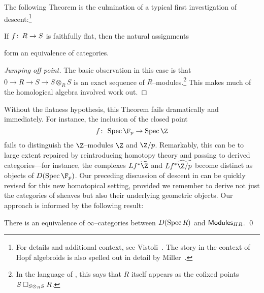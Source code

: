 The following Theorem is the culmination of a typical first investigation of descent:\footnote{For details and additional context, see Vistoli~\cite[Section 4.2.1]{Vistoli}.  The story in the context of Hopf algebroids is also spelled out in detail by Miller~\cite{MillerSheavesGradings}.}

\begin{theorem}[Grothendieck]\label{OriginalFFDescent}
If $f\colon\thinspace R \to S$ is faithfully flat, then the natural assignments
\begin{center}
\end{center}
form an equivalence of categories.
\end{theorem}
\begin{proof}[Jumping off point]
The basic observation in this case is that $0 \to R \to S \to S \otimes_R S$ is an exact sequence of $R$--modules.\footnote{In the language of , this says that $R$ itself appears as the cofixed points $S \mathbin\square_{S \otimes_R S} R$.}  This makes much of the homological algebra involved work out.
\end{proof}

Without the flatness hypothesis, this Theorem fails dramatically and immediately.  For instance, the inclusion of the closed point \[f\co \Spec \F_p \to \Spec \Z\] fails to distinguish the $\Z$--modules $\Z$ and $\Z/p$.  Remarkably, this can be to large extent repaired by reintroducing homotopy theory and passing to derived categories---for instance, the complexes $Lf^* \widetilde{\Z}$ and $Lf^* \widetilde{\Z/p}$ become distinct as objects of $D(\Spec \F_p)$.  Our preceding discussion of descent in  can be quickly revised for this new homotopical setting, provided we remember to derive not just the categories of sheaves but also their underlying geometric objects.  Our approach is informed by the following result:

\begin{lemma}
There is an equivalence of $\infty$--categories between $D(\operatorname{Spec} R)$ and $\mathsf{Modules}_{HR}$. \qed
\end{lemma}

